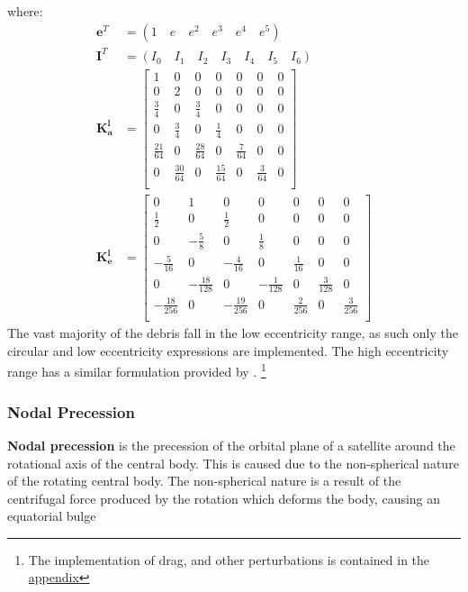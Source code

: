 \documentclass[a4paper, 12pt]{article}
\newcommand{\boldindex}[1]{%
	\textbf{#1}\index{#1}%
}
\begin{document}
where:\begin{align}
	 \boldsymbol{e}^T &=(1\quad  e\quad e^2\quad e^3\quad e^4\quad e^5)\\
	\boldsymbol{I}^T &=(I_0\quad  I_1\quad I_2\quad I_3\quad I_4\quad I_5\quad I_6)\\
	\boldsymbol{K_a^l} &= \begin{bmatrix}
		1 & 0 & 0 & 0 &0&0 &0\\
		0 & 2 & 0 & 0 &0&0 &0\\
		\frac{3}{4} & 0 & \frac{3}{4} & 0 &0&0 &0\\
		0 & \frac{3}{4} & 0 & \frac{1}{4} &0&0 &0\\
	    \frac{21}{64} & 0 & \frac{28}{64} & 0 &\frac{7}{64}&0 &0\\
	    0 & \frac{30}{64} & 0 & \frac{15}{64} &0&\frac{3}{64} &0\\
	\end{bmatrix}\\
	\boldsymbol{K_e^l} &= \begin{bmatrix}
		0 & 1 & 0 & 0 &0&0 &0\\
		\frac{1}{2} & 0 & \frac{1}{2} & 0 &0&0 &0\\
		0 & -\frac{5}{8}  & 0 & \frac{1}{8}  &0&0 &0\\
		-\frac{5}{16}  & 0 & -\frac{4}{16}  &0 &\frac{1}{16} &0 &0\\
		0 & -\frac{18}{128} & 0& -\frac{1}{128}  &0&\frac{3}{128}  &0\\
		-\frac{18}{256}  & 0 & -\frac{19}{256}  & 0 &\frac{2}{256} &0 &\frac{3}{256} \\
	\end{bmatrix}
\end{align}
The vast majority of the debris fall in the low eccentricity range, as such only the circular and low eccentricity expressions are implemented. The high eccentricity range has a similar formulation provided by \cite{frey_extension_2019}. \footnote{The implementation of drag, and other perturbations is contained in the \hyperref[subsec:propagation]{appendix}}


\subsubsection{Nodal Precession}

\boldindex{Nodal precession} is the precession of the orbital plane of a satellite around the rotational axis of the central body. This is caused due to the non-spherical nature of the rotating central body. The non-spherical nature is a result of the centrifugal force produced by the rotation which  deforms the body, causing an equatorial bulge
\end{document}
